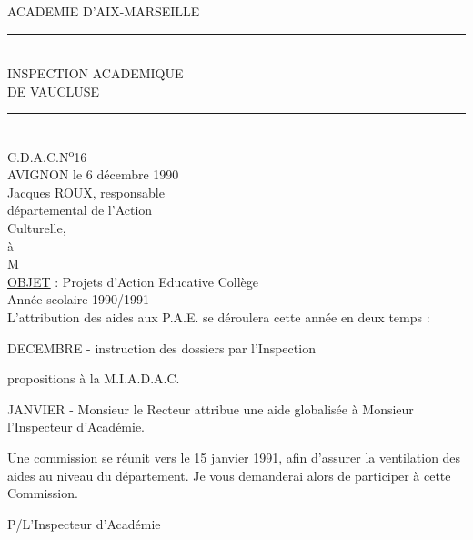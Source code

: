 ACADEMIE D'AIX-MARSEILLE\\
\rule{2cm}{0.4pt}\\
INSPECTION ACADEMIQUE\\
DE VAUCLUSE\\
\rule{0.9cm}{0.4pt}\\

C.D.A.C.N\textsuperscript{o}16\\

AVIGNON le 6 décembre 1990\\

Jacques ROUX, responsable\\
départemental de l'Action\\
Culturelle,\\

à\\
M\\

\uline{OBJET} : Projets d'Action Educative Collège \\
Année scolaire 1990/1991\\

L'attribution des aides aux P.A.E. se déroulera cette année en deux temps :

DECEMBRE \quad - instruction des dossiers par l'Inspection 

propositions à la M.I.A.D.A.C.

JANVIER \quad - Monsieur le Recteur attribue une aide globalisée à Monsieur l'Inspecteur d'Académie.

Une commission se réunit vers le 15 janvier 1991, afin d'assurer la ventilation des aides au niveau du département. Je vous demanderai alors de participer à cette Commission.

P/L'Inspecteur d'Académie\\
\\

